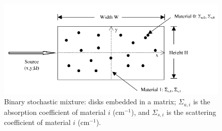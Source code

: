 \documentclass{article}                                                                           %
\begin{document}
\begin{figure}%
  \centering
  \includegraphics[trim = 10mm 0mm 10mm 0mm, width=140mm]{DonovanFig1.PNG}
  \caption{Binary stochastic mixture: disks embedded in a matrix; $\Sigma_{a,i}$ is the absorption coefficient of material $i$ (cm$^{-1}$), and $\Sigma_{s,i}$ is the scattering coefficient of material $i$ (cm$^{-1}$).}
  \label{fig:DonovanFig1}
\end{figure}
\end{document}
